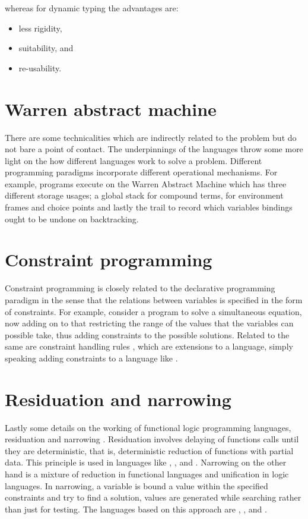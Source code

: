 \documentclass[proposal.tex]{subfiles}
\begin{document}
whereas for dynamic typing the advantages are:
\begin{itemize}
\item less rigidity,
\item suitability, and
\item re-usability.
\end{itemize}



\section{Warren abstract machine}
There are some technicalities which are indirectly related to the problem but do not bare a point of contact.
The underpinnings of the languages throw some more light on the how different languages work to solve a problem.
Different programming paradigms incorporate different operational mechanisms.
For example,  programs execute on the Warren Abstract Machine \cite{ait1999warren} which has three
different storage usages; a global stack for compound terms, for environment frames and choice points and lastly
the trail to record which variables bindings ought to be undone on backtracking.

\section{Constraint programming}
Constraint programming \cite{website:constraintprogwiki} is closely related to the declarative programming paradigm
in the sense that the relations between variables is specified in the form of constraints.
For example, consider a program to solve a simultaneous equation, now adding on to that restricting the range of
the values that the variables can possible take, thus adding constraints to the possible solutions.
Related to the same are constraint handling rules \cite{website:chrwiki}, which are extensions to a language,
simply speaking adding constraints to a language like .


\section{Residuation and narrowing}
Lastly some details on the working of functional logic programming languages, residuation and narrowing
\cite{hanus1995curry,webiste:wikicurry}.
Residuation involves delaying of functions calls until they are deterministic, that is, deterministic reduction of
functions with partial data.
This principle is used in languages like  \cite{lloyd1999programming:escher}, 
\cite{website:life},  \cite{website:nue-prolog} and  \cite{website:oz-mozart}.
Narrowing on the other hand is a mixture of reduction in functional languages and unification in logic languages.
In narrowing, a variable is bound a value within the specified constraints and try to find a solution, values are
generated while searching rather than just for testing.
The languages based on this approach are  \cite{website:alf},  \cite{website:babel},
 \cite{bert1987lpg} and  \cite{website:curry}.
\end{document}
